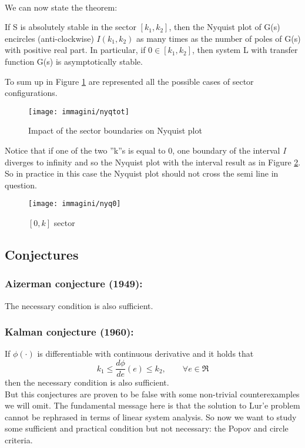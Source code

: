 \\ We can now state the theorem:
\begin{thm}
	If S is absolutely stable in the sector $[k_1, k_2]$, then the Nyquist plot of G(s) encircles (anti-clockwise) $I(k_1,k_2)$ as many times as the number of poles of G(s) with positive real part.
	In particular, if $0\in[k_1, k_2]$, then system L with transfer function G(s) is asymptotically stable.
\end{thm}
To sum up in Figure \ref{fig:nyqtot} are represented all the possible cases of sector configurations.
\begin{figure}[H]
	\centering
	\texttt{[image: immagini/nyqtot]}
	\caption{Impact of the sector boundaries on Nyquist plot}
	\label{fig:nyqtot}
\end{figure}
 Notice that if one of the two ''k''s is equal to 0, one boundary of the interval \emph{I} diverges to infinity and so the Nyquist plot with the interval result as in Figure \ref{fig:nyq0}. So in practice in this case the Nyquist plot should not cross the semi line in question.
\begin{figure}[H]
 	\centering
 	\texttt{[image: immagini/nyq0]}
 	\caption{$[0,k]$ sector}
 	\label{fig:nyq0}
\end{figure}
\subsection{Conjectures}
\subsubsection{Aizerman conjecture (1949):}
The necessary condition is also sufficient.
\subsubsection{Kalman conjecture (1960):}
If $\phi(\cdot)$ is differentiable with continuous derivative and it holds that 
\[
k_1\le\frac{d\phi}{de}(e)\le k_2, \qquad \forall e\in\Re
\]then the necessary condition is also sufficient.\\
But this conjectures are proven to be false with some non-trivial counterexamples we will omit. The fundamental message here is that the solution to Lur'e problem cannot be rephrased in terms of linear system analysis.
\linebreak
So now we want to study some sufficient and practical condition but not necessary: the Popov and circle criteria.
